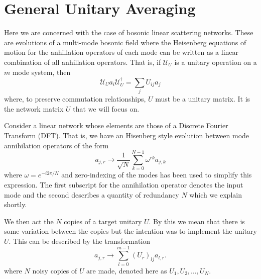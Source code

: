 \documentclass[aps,pra,twocolumn,superscriptaddress,numerical]{revtex4-1}
\begin{document}
\section{General Unitary Averaging\label{gen case}}

Here we are concerned with the case of bosonic linear scattering networks.  These are evolutions of a multi-mode bosonic field where the Heisenberg equations of motion for the anhillation operators of each mode can be written as a linear combination of all anhillation operators.  That is, if $\mathcal{U}_U$ is a unitary operation on a $m$ mode system, then
\begin{equation}
	\mathcal{U}_U a_i \mathcal{U}_U^\dagger = \sum_j U_{ij} a_j
\end{equation}
where, to preserve commutation relationships, $U$ must be a unitary matrix.  It is the network matrix $U$ that we will focus on.

Consider a linear network whose elements are those of a Discrete Fourier Transform (DFT).  That is, we have an Hisenberg style evolution between mode annihilation operators of the form
\begin{equation}
	a_{j,r} \rightarrow \frac{1}{\sqrt{N}} \sum_{k=0}^{N-1} \omega^{rk} a_{j,k}	
\end{equation}
where $\omega = e^{-i2\pi /N}$ and zero-indexing of the modes has been used to simplify this expression.  The first subscript for the annihilation operator denotes the input mode and the second describes a quantity of redundancy $N$ which we explain shortly. 

We then act the $N$ copies of a target unitary $U$.  By this we mean that there is some variation between the copies but the intention was to implement the unitary $U$.  This can be described by the transformation
\begin{equation}
	a_{j,r} \rightarrow \sum_{l=0}^{m-1} (U_r)_{lj} a_{l,r}.
\end{equation}
where $N$ noisy copies of $U$ are made, denoted here as $U_1, U_2, \ldots, U_N$. 
\end{document}
